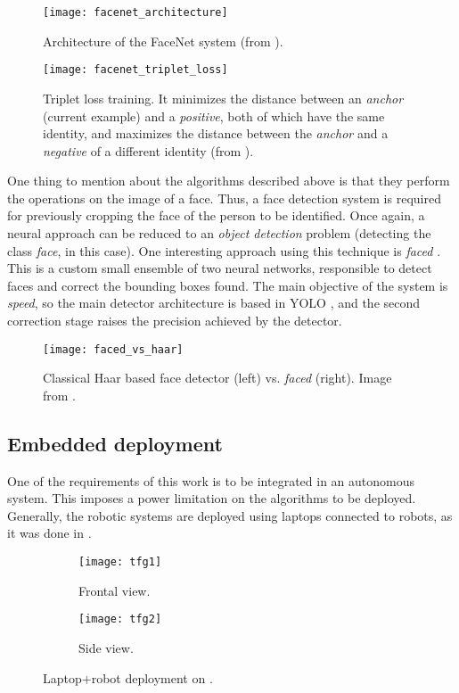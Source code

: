 \begin{figure}[h]
	\centering
	\texttt{[image: facenet\_architecture]}
	\caption{Architecture of the FaceNet system (from \cite{facenet}).}
	\label{fig:1_facenet_architecture}
\end{figure}



\begin{figure}[h]
	\centering
	\texttt{[image: facenet\_triplet\_loss]}
	\caption{Triplet loss training. It minimizes the distance between an \emph{anchor} (current example) and a \emph{positive}, both of which have the same identity, and maximizes the distance between the \emph{anchor} and a \emph{negative} of a different identity (from \cite{facenet}).}
	\label{fig:1_facenet_triplet_loss}
\end{figure}


One thing to mention about the algorithms described above is that they perform the operations on the image of a face. Thus, a face detection system is required for previously cropping the face of the person to be identified. Once again, a neural approach can be reduced to an \textit{object detection} problem (detecting the class \textit{face}, in this case). One interesting approach using this technique is \textit{faced} \cite{faced}. This is a custom small ensemble of two neural networks, responsible to detect faces and correct the bounding boxes found. The main objective of the system is \textit{speed}, so the main detector architecture is based in YOLO \cite{yolov1}, and the second correction stage raises the precision achieved by the detector.

\begin{figure}[h]
	\centering
	\texttt{[image: faced\_vs\_haar]}
	\caption{Classical Haar based face detector \cite{violajones} (left) vs. \textit{faced} (right). Image from \cite{faced}.}
	\label{fig:1_faced_vs_haar}
\end{figure}


\subsection{Embedded deployment}
One of the requirements of this work is to be integrated in an autonomous system. This imposes a power limitation on the algorithms to be deployed. Generally, the robotic systems are deployed using laptops connected to robots, as it was done in \cite{tfg}.

\begin{figure}[h]
	\centering
	\begin{subfigure}[h]{0.4\linewidth}
		\texttt{[image: tfg1]}
		\caption{Frontal view.}
		\label{fig:1_turtlebot_front}
	\end{subfigure}
	\begin{subfigure}[h]{0.4\linewidth}
		\texttt{[image: tfg2]}
		\caption{Side view.}
		\label{fig:1_turtlebot_side}
	\end{subfigure}
	\caption{Laptop+robot deployment on \cite{tfg}.}
	\label{fig:1_real_tfg}
\end{figure}

